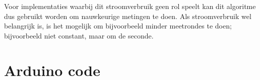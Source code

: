 \documentclass[a4paper,10pt]{article}
\begin{document}
Voor implementaties waarbij dit stroomverbruik geen rol speelt kan dit algoritme dus gebruikt worden om nauwkeurige metingen te doen. Als stroomverbruik wel belangrijk is, is het mogelijk om bijvoorbeeld minder meetrondes te doen; bijvoorbeeld niet constant, maar om de seconde.





\newpage
\appendix
\section{Arduino code}
\label{sec:code}

\end{document}
